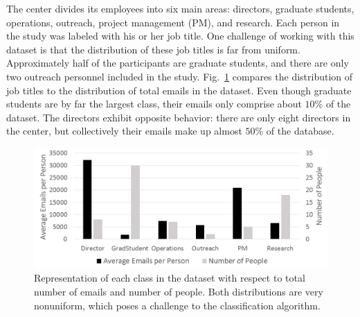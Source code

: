 \documentclass[10pt,twocolumn,conference]{IEEEtran}
\begin{document}
\begin{table}[t]
\centering
\caption{A comparison between the internal dataset and the Enron email corpus.}
\label{tab:db_stats}
\end{table}


The center divides its employees into six main areas: directors, graduate students, operations, outreach, project management (PM), and research.
Each person in the study was labeled with his or her job title.
One challenge of working with this dataset is that the distribution of these job titles is far from uniform.
Approximately half of the participants are graduate students, and there are only two outreach personnel included in the study.
Fig.~\ref{fig:db_bar} compares the distribution of job titles to the distribution of total emails in the dataset.
Even though graduate students are by far the largest class, their emails only comprise about $10\%$ of the dataset.
The directors exhibit opposite behavior: there are only eight directors in the center, but collectively their emails make up almost $50\%$ of the database.

\begin{figure}[t]
	\centering
	\includegraphics[width=\columnwidth,trim={1mm 5mm 1mm 5mm},clip]{DatasetStatsBar_BW}
	\caption{Representation of each class in the dataset with respect to total number of emails and number of people.  Both distributions are very nonuniform, which poses a challenge to the classification algorithm.}
	\label{fig:db_bar}
\end{figure}
\end{document}
